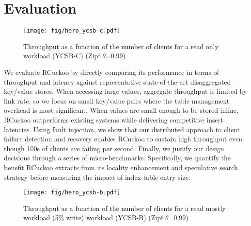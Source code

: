 \section{Evaluation}
\label{sec:eval}

\begin{figure}
  \center
  \texttt{[image: fig/hero\_ycsb-c.pdf]}
  \caption{Throughput as a function of the number of clients for a read only workload (YCSB-C) (Zipf $\theta$=0.99)}
  \label{fig:ycsb_throughput_c}
\end{figure}

We evaluate RCuckoo by directly comparing its performance in terms of
throughput and latency against representative state-of-the-art
disaggregated key/value stores.  When accessing large values,
aggregate throughput is limited by link rate, so we focus on small
key/value pairs where the table management overhead is most
significant.  When values are small enough to be stored inline,
RCuckoo outperforms existing systems while delivering competitive
insert latencies.  Using fault injection, we show that our distributed
approach to client failure detection and recovery enables RCuckoo to
sustain high throughput even though 100s of clients are failing per
second.  Finally, we justify our design decisions through a series of
micro-benchmarks. Specifically, we quantify the benefit RCuckoo
extracts from its locality enhancement and speculative search strategy
before measuring the impact of
index-table entry size.



\begin{figure}
  \center
  \texttt{[image: fig/hero\_ycsb-b.pdf]}
  \caption{Throughput as a function of the number of clients for a read mostly workload (5\% write) workload (YCSB-B) (Zipf $\theta$=0.99)}
  \label{fig:ycsb_throughput_b}
\end{figure}




